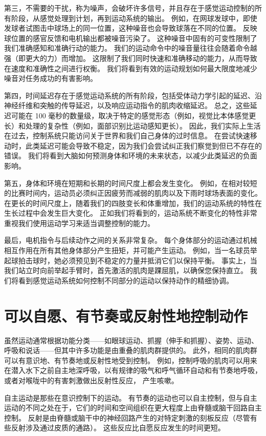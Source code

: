 第三，不需要的干扰，称为噪声，会破坏许多信号，并且存在于感觉运动控制的所有阶段，从感觉处理到计划，再到运动系统的输出。 例如，在网球发球中，即使发球者试图击中球场上的同一位置，这种噪音也会导致球落在不同的位置。 反映球位置的感官反馈和电机输出都被噪音污染了。 这种噪音中固有的可变性限制了我们准确感知和准确行动的能力。 我们的运动命令中的噪音量往往会随着命令越强（即更大的力）而增加。 这限制了我们同时快速和准确移动的能力，从而导致在速度和准确性之间进行权衡。 我们将看到有效的运动规划如何最大限度地减少噪音对任务成功的有害影响。

第四，时间延迟存在于感觉运动系统的所有阶段，包括受体动力学引起的延迟、沿神经纤维和突触的传导延迟，以及响应运动指令的肌肉收缩延迟。 总之，这些延迟可能在 100 毫秒的数量级，取决于特定的感觉形态（例如，视觉比本体感觉更长）和处理的复杂性（例如，面部识别比运动感知更长）。 因此，我们实际上生活在过去，控制系统只能访问关于世界和我们自己身体的过时信息。 在尝试快速移动时，此类延迟可能会导致不稳定，因为我们会尝试纠正我们察觉到但已不存在的错误。 我们将看到大脑如何预测身体和环境的未来状态，以减少此类延迟的负面影响。

第五，身体和环境在短期和长期的时间尺度上都会发生变化。 例如，在相对较短的比赛时间内，运动员必须纠正因疲劳而减弱的肌肉以及下雨时球场表面的变化。 在更长的时间尺度上，随着我们的四肢变长和体重增加，我们的运动系统的特性在生长过程中会发生巨大变化。 正如我们将看到的，运动系统不断变化的特性非常重视我们使用运动学习来适当调整控制的能力。

最后，电机指令与后续动作之间的关系非常复杂。 每个身体部分的运动通过机械相互作用在所有其他身体部分产生扭矩，并可能产生运动。 例如，当一名球员举起球拍击球时，她必须预见到不稳定的力量并抵消它们以保持平衡。 事实上，当我们站立时向前举起手臂时，首先激活的肌肉是踝屈肌，以确保您保持直立。 我们将看到感觉运动系统如何控制不同部分的运动以保持动作的精细协调。


\section{可以自愿、有节奏或反射性地控制动作}

虽然运动通常根据功能分类——如眼球运动、抓握（伸手和抓握）、姿势、运动、呼吸和说话——但其中许多功能是由重叠的肌肉群提供的。 此外，相同的肌肉群可以有意识地、有节奏地或反射性地受到控制。 例如，控制呼吸的肌肉可以用来在潜入水下之前自主地深呼吸，以有规律的吸气和呼气循环自动和有节奏地呼吸，或者对喉咙中的有害刺激做出反射性反应， 产生咳嗽。

自主运动是那些在意识控制下的运动。 有节奏的运动也可以自主控制，但与自主运动的不同之处在于，它们的时间和空间组织在更大程度上由脊髓或脑干回路自主控制。 反射是由脊髓或脑干中的神经回路产生的对特定刺激的刻板反应（尽管有些反射涉及通过皮质的通路）。 这些反应比自愿反应发生的时间更短。

